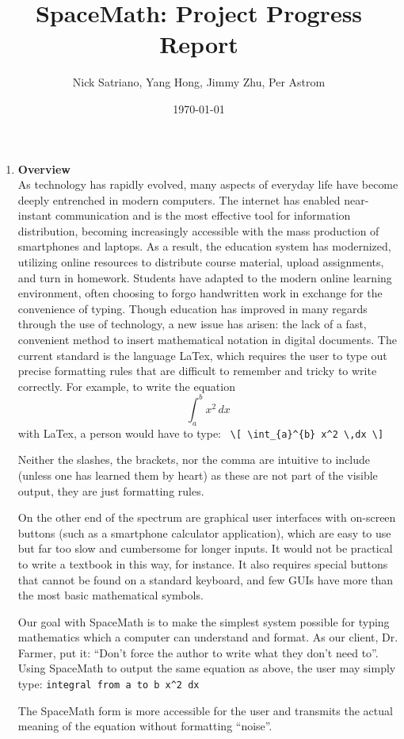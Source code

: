 \documentclass[11pt]{article}
\title{SpaceMath: Project Progress Report}
\author{Nick Satriano, Yang Hong, Jimmy Zhu, Per Astrom}
\date{\today}
\theoremstyle{definition}
\begin{document}
\maketitle
\begin{enumerate}
\item \textbf{Overview} \\
As technology has rapidly evolved, many aspects of everyday life have become deeply entrenched in modern computers. The internet has enabled near-instant communication and is the most effective tool for information distribution, becoming increasingly accessible with the mass production of smartphones and laptops. As a result, the education system has modernized, utilizing online resources to distribute course material, upload assignments, and turn in homework. Students have adapted to the modern online learning environment, often choosing to forgo handwritten work in exchange for the convenience of typing. Though education has improved in many regards through the use of technology, a new issue has arisen:  the lack of a fast, convenient method to insert mathematical notation in digital documents. The current standard is the language LaTex, which requires the user to type out precise formatting rules that are difficult to remember and tricky to write correctly. For example, to write the equation \[ \int_{a}^{b} x^2 \,dx \]
with LaTex, a person would have to type: \verb| \[ \int_{a}^{b} x^2 \,dx \]|

Neither the slashes, the brackets, nor the comma are intuitive to include (unless one has learned them by heart) as these are not part of the visible output, they are just formatting rules.

On the other end of the spectrum are graphical user interfaces with on-screen buttons (such as a smartphone calculator application), which are easy to use but far too slow and cumbersome for longer inputs. It would not be practical to write a textbook in this way, for instance. It also requires special buttons that cannot be found on a standard keyboard, and few GUIs have more than the most basic mathematical symbols.

Our goal with SpaceMath is to make the simplest system possible for typing mathematics which a computer can understand and format. As our client, Dr. Farmer, put it: “Don’t force the author to write what they don’t need to”.
Using SpaceMath to output the same equation as above, the user may simply type: \verb|integral from a to b x^2 dx|

The SpaceMath form is more accessible for the user and transmits the actual meaning of the equation without formatting “noise”.


\end{enumerate}
\end{document}
